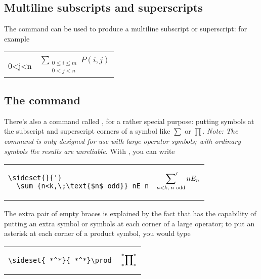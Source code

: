 \subsection{Multiline subscripts and superscripts}

The  command can be used to produce a multiline subscript
or superscript:\relax
{} for example
\begin{center}
\begin{tabular}{ll}
\begin{minipage}[t]{.6\columnwidth}
\begin{verbatim}
\sum_{\substack{
         0\le i\le m\\
         0<j<n}}
  P(i,j)
\end{verbatim}
\end{minipage}
&
$\displaystyle
\sum_{\substack{0\le i\le m\\ 0<j<n}} P(i,j)$
\end{tabular}
\end{center}

\subsection{The  command}\label{sideset}

There's also a command called , for a rather special
purpose: putting symbols at the subscript and
superscript corners of a
symbol like $\sum$ or $\prod$. \emph{Note: The
   command is only designed for use with large operator
  symbols; with ordinary symbols the results are unreliable.}
With , you can write
\begin{center}
\begin{tabular}{ll}
\begin{minipage}[t]{.6\columnwidth}
\begin{verbatim}
\sideset{}{'}
  \sum_{n<k,\;\text{$n$ odd}} nE_n
\end{verbatim}
\end{minipage}
&$\displaystyle
\sideset{}{'}\sum_{n<k,\;\text{$n$ odd}} nE_n
$
\end{tabular}
\end{center}
The extra pair of empty braces is explained by the fact that
 has the capability of putting an extra symbol or symbols at
each corner of a large operator; to put an asterisk at each corner of a
product symbol, you would type
\begin{center}
\begin{tabular}{ll}
\begin{minipage}[t]{.6\columnwidth}
\begin{verbatim}
\sideset{_*^*}{_*^*}\prod
\end{verbatim}
\end{minipage}
&$\displaystyle
\sideset{_*^*}{_*^*}\prod
$
\end{tabular}
\end{center}

